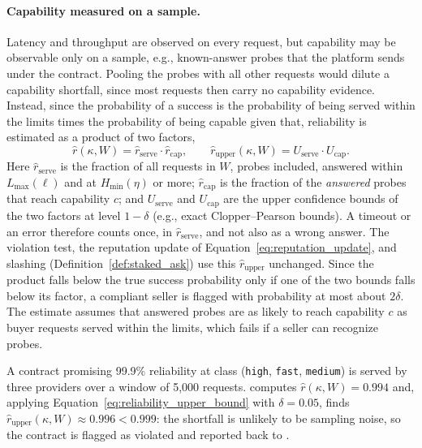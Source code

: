\paragraph{Capability measured on a sample.}
Latency and throughput are observed on every request, but capability may be
observable only on a sample, e.g., known-answer probes that the platform sends
under the contract. Pooling the probes with all other requests would dilute a
capability shortfall, since most requests then carry no capability evidence.
Instead, since the probability of a success is the probability of being served
within the limits times the probability of being capable given that,
reliability is estimated as a product of two factors,
\begin{equation}
  \label{eq:product_reliability}
  \hat r(\kappa, W) = \hat r_{\text{serve}} \cdot \hat r_{\text{cap}},
  \qquad
  \hat r_{\text{upper}}(\kappa, W) = U_{\text{serve}} \cdot U_{\text{cap}}.
\end{equation}
Here $\hat r_{\text{serve}}$ is the fraction of all requests in $W$, probes
included, answered within $L_{\max}(\ell)$ and at $H_{\min}(\eta)$ or more;
$\hat r_{\text{cap}}$ is the fraction of the \emph{answered} probes that reach
capability $c$; and $U_{\text{serve}}$ and $U_{\text{cap}}$ are the upper
confidence bounds of the two factors at level $1 - \delta$ (e.g., exact
Clopper--Pearson bounds). A timeout or an error therefore counts once, in
$\hat r_{\text{serve}}$, and not also as a wrong answer. The violation test,
the reputation update of Equation~\eqref{eq:reputation_update}, and slashing
(Definition~\ref{def:staked_ask}) use this $\hat r_{\text{upper}}$ unchanged.
Since the product falls below the true success probability only if one of the
two bounds falls below its factor, a compliant seller is flagged with
probability at most about $2\delta$. The estimate assumes that answered probes
are as likely to reach capability $c$ as buyer requests served within the
limits, which fails if a seller can recognize probes.

\begin{example}
\label{ex:fulfillment_reporting}
A contract promising 99.9\% reliability at class
(\texttt{high}, \texttt{fast}, \texttt{medium}) is
served by three providers over a window of 5,000 requests. \NoesisServer{}
computes $\hat r(\kappa, W) = 0.994$ and, applying
Equation~\eqref{eq:reliability_upper_bound} with $\delta = 0.05$, finds
$\hat r_{\text{upper}}(\kappa, W) \approx 0.996 < 0.999$: the shortfall is
unlikely to be sampling noise, so the contract is flagged as violated and reported back
to \NoesisMarket.
\end{example}

